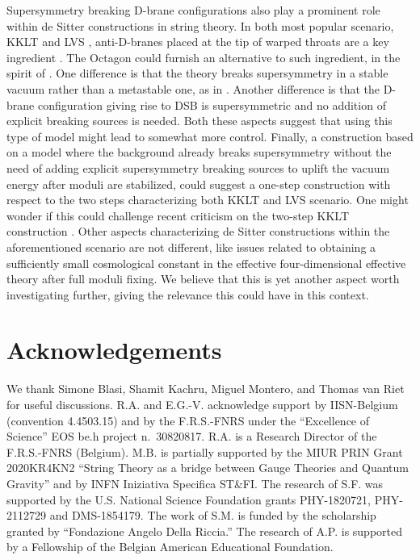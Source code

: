 \documentclass[a4paper,12pt]{article}
\begin{document}
{Supersymmetry breaking D-brane configurations also play a prominent role within de Sitter constructions in string theory. In both most popular scenario, KKLT \cite{Kachru:2003aw} and LVS \cite{Balasubramanian:2005zx},  anti-D-branes placed at the tip of warped throats are a key ingredient \cite{Kachru:2002gs}. The Octagon could furnish an alternative to such ingredient, in the spirit of \cite{Retolaza:2015nvh}. One difference is that the theory breaks supersymmetry in a stable vacuum rather than a metastable one, as in \cite{Kachru:2002gs}. Another difference is that the D-brane configuration giving rise to DSB is supersymmetric and no addition of explicit breaking sources is needed. Both these aspects suggest that using this type of model might lead to somewhat more control. Finally, a construction based on a model where the background already breaks supersymmetry without the need of adding explicit supersymmetry breaking sources to uplift the vacuum energy after moduli are stabilized, could suggest a one-step construction with respect to the two steps characterizing both KKLT and LVS scenario. One might wonder if this could challenge recent criticism on the two-step KKLT construction \cite{Lust:2022lfc}. Other aspects characterizing de Sitter constructions within the aforementioned scenario are not different, like issues related to obtaining a sufficiently small cosmological constant in the effective four-dimensional effective theory after full moduli fixing. We believe that this is yet another aspect worth investigating further, giving the relevance this could have in this context.
	
\section*{Acknowledgements}

We thank Simone Blasi, Shamit Kachru, Miguel Montero, and Thomas van Riet for useful discussions. 
R.A. and E.G.-V. acknowledge support by IISN-Belgium (convention 4.4503.15) and by the F.R.S.-FNRS under the ``Excellence of Science'' EOS be.h project n.~30820817. R.A. is a Research Director of the F.R.S.-FNRS (Belgium). M.B. is partially supported by the MIUR PRIN Grant 2020KR4KN2 ``String Theory as a bridge between Gauge Theories and Quantum Gravity'' and by INFN Iniziativa Specifica ST\&FI. The research of S.F. was supported by the U.S. National Science Foundation grants PHY-1820721, PHY- 2112729 and DMS-1854179. The work of S.M. is funded by the scholarship granted by ``Fondazione Angelo Della Riccia.'' The research of A.P. is supported by a Fellowship of the Belgian American Educational Foundation. 


}
\end{document}
